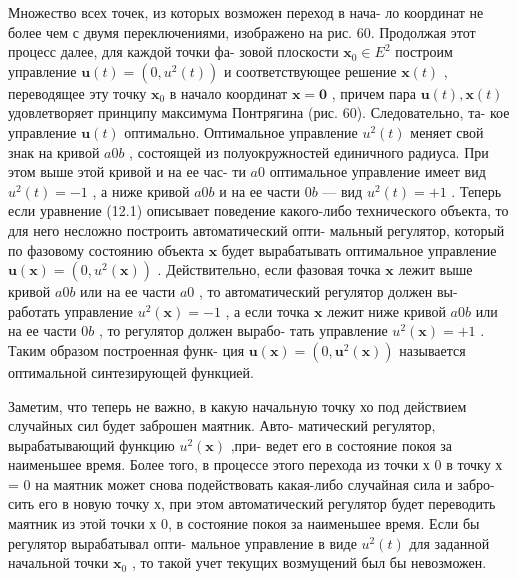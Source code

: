 \documentclass[8pt]{extarticle}
\begin{document}
Множество всех точек, из которых возможен переход в нача- ло координат не более чем с двумя переключениями, изображено на рис. 60. Продолжая этот процесс далее, для каждой точки фа- зовой плоскости \({\mathbf{x}}_{0} \in  {E}^{2}\) построим управление \(\mathbf{u}\left( t\right)  = \left( {0,{u}^{2}\left( t\right) }\right)\) и соответствующее решение \(\mathbf{x}\left( t\right)\) , переводящее эту точку \({\mathbf{x}}_{0}\) в начало координат \(\mathbf{x} = \mathbf{0}\) , причем пара \(\mathbf{u}\left( t\right) ,\mathbf{x}\left( t\right)\) удовлетворяет принципу максимума Понтрягина (рис. 60). Следовательно, та- кое управление \(\mathbf{u}\left( t\right)\) оптимально. Оптимальное управление \({u}^{2}\left( t\right)\) меняет свой знак на кривой \(a0b\) , состоящей из полуокружностей единичного радиуса. При этом выше этой кривой и на ее час- ти \(a0\) оптимальное управление имеет вид \({u}^{2}\left( t\right)  =  - 1\) , а ниже кривой \(a0b\) и на ее части \(0b\) — вид \({u}^{2}\left( t\right)  =  + 1\) . Теперь если уравнение (12.1) описывает поведение какого-либо технического объекта, то для него несложно построить автоматический опти- мальный регулятор, который по фазовому состоянию объекта \(\mathbf{x}\) будет вырабатывать оптимальное управление \(\mathbf{u}\left( \mathbf{x}\right)  = \left( {0,{u}^{2}\left( \mathbf{x}\right) }\right)\) . Действительно, если фазовая точка \(\mathbf{x}\) лежит выше кривой \(a0b\) или на ее части \(a0\) , то автоматический регулятор должен вы- работать управление \({u}^{2}\left( \mathbf{x}\right)  =  - 1\) , а если точка \(\mathbf{x}\) лежит ниже кривой \(a0b\) или на ее части \(0b\) , то регулятор должен вырабо- тать управление \({u}^{2}\left( \mathbf{x}\right)  =  + 1\) . Таким образом построенная функ- ция \(\mathbf{u}\left( \mathbf{x}\right)  = \left( {0,{\mathbf{u}}^{2}\left( \mathbf{x}\right) }\right)\) называется оптимальной синтезирующей функцией.

Заметим, что теперь не важно, в какую начальную точку хо под действием случайных сил будет заброшен маятник. Авто- матический регулятор, вырабатывающий функцию \({u}^{2}\left( \mathbf{x}\right)\) ,при- ведет его в состояние покоя за наименьшее время. Более того, в процессе этого перехода из точки х 0 в точку х = 0 на маятник может снова подействовать какая-либо случайная сила и забро- сить его в новую точку х, при этом автоматический регулятор будет переводить маятник из этой точки х 0, в состояние покоя за наименьшее время. Если бы регулятор вырабатывал опти- мальное управление в виде \({u}^{2}\left( t\right)\) для заданной начальной точки \({\mathbf{x}}_{0}\) , то такой учет текущих возмущений был бы невозможен.
\end{document}
